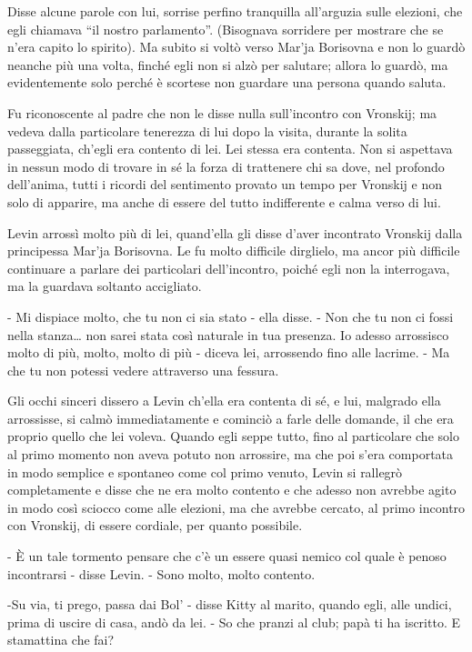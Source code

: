 Disse alcune parole con lui, sorrise perfino tranquilla all'arguzia sulle elezioni, che egli chiamava ``il nostro parlamento''. (Bisognava sorridere per mostrare che se n'era capito lo spirito). Ma subito si voltò verso Mar'ja Borisovna e non lo guardò neanche più una volta, finché egli non si alzò per salutare; allora lo guardò, ma evidentemente solo perché è scortese non guardare una persona quando saluta. 

Fu riconoscente al padre che non le disse nulla sull'incontro con Vronskij; ma vedeva dalla particolare tenerezza di lui dopo la visita, durante la solita passeggiata, ch'egli era contento di lei. Lei stessa era contenta. Non si aspettava in nessun modo di trovare in sé la forza di trattenere chi sa dove, nel profondo dell'anima, tutti i ricordi del sentimento provato un tempo per Vronskij e non solo di apparire, ma anche di essere del tutto indifferente e calma verso di lui. 

Levin arrossì molto più di lei, quand'ella gli disse d'aver incontrato Vronskij dalla principessa Mar'ja Borisovna. Le fu molto difficile dirglielo, ma ancor più difficile continuare a parlare dei particolari dell'incontro, poiché egli non la interrogava, ma la guardava soltanto accigliato. 

- Mi dispiace molto, che tu non ci sia stato - ella disse. - Non che tu non ci fossi nella stanza\ldots{} non sarei stata così naturale in tua presenza. Io adesso arrossisco molto di più, molto, molto di più - diceva lei, arrossendo fino alle lacrime. - Ma che tu non potessi vedere attraverso una fessura. 

Gli occhi sinceri dissero a Levin ch'ella era contenta di sé, e lui, malgrado ella arrossisse, si calmò immediatamente e cominciò a farle delle domande, il che era proprio quello che lei voleva. Quando egli seppe tutto, fino al particolare che solo al primo momento non aveva potuto non arrossire, ma che poi s'era comportata in modo semplice e spontaneo come col primo venuto, Levin si rallegrò completamente e disse che ne era molto contento e che adesso non avrebbe agito in modo così sciocco come alle elezioni, ma che avrebbe cercato, al primo incontro con Vronskij, di essere cordiale, per quanto possibile. 

- È un tale tormento pensare che c'è un essere quasi nemico col quale è penoso incontrarsi - disse Levin. - Sono molto, molto contento. 

-Su via, ti prego, passa dai Bol' - disse Kitty al marito, quando egli, alle undici, prima di uscire di casa, andò da lei. - So che pranzi al club; papà ti ha iscritto. E stamattina che fai? 

